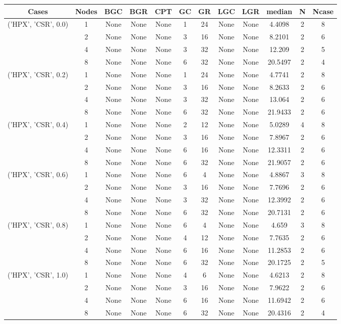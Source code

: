 \begin{tabular}{cccccccccccc}
\hline
Cases & Nodes& BGC& BGR& CPT& GC& GR& LGC& LGR& median & N & Ncase \\
\hline
\multirow{4}{*}{('HPX', 'CSR', 0.0)}& 1& None& None& None& 1& 24& None& None& 4.4098& 2& 8\\
& 2& None& None& None& 3& 16& None& None& 8.2101& 2& 6\\
& 4& None& None& None& 3& 32& None& None& 12.209& 2& 5\\
& 8& None& None& None& 6& 32& None& None& 20.5497& 2& 4\\
\hline
\multirow{4}{*}{('HPX', 'CSR', 0.2)}& 1& None& None& None& 1& 24& None& None& 4.7741& 2& 8\\
& 2& None& None& None& 3& 16& None& None& 8.2633& 2& 6\\
& 4& None& None& None& 3& 32& None& None& 13.064& 2& 6\\
& 8& None& None& None& 6& 32& None& None& 21.9433& 2& 6\\
\hline
\multirow{4}{*}{('HPX', 'CSR', 0.4)}& 1& None& None& None& 2& 12& None& None& 5.0289& 4& 8\\
& 2& None& None& None& 3& 16& None& None& 7.8967& 2& 6\\
& 4& None& None& None& 6& 16& None& None& 12.3311& 2& 6\\
& 8& None& None& None& 6& 32& None& None& 21.9057& 2& 6\\
\hline
\multirow{4}{*}{('HPX', 'CSR', 0.6)}& 1& None& None& None& 6& 4& None& None& 4.8867& 3& 8\\
& 2& None& None& None& 3& 16& None& None& 7.7696& 2& 6\\
& 4& None& None& None& 3& 32& None& None& 12.3992& 2& 6\\
& 8& None& None& None& 6& 32& None& None& 20.7131& 2& 6\\
\hline
\multirow{4}{*}{('HPX', 'CSR', 0.8)}& 1& None& None& None& 6& 4& None& None& 4.659& 3& 8\\
& 2& None& None& None& 4& 12& None& None& 7.7635& 2& 6\\
& 4& None& None& None& 6& 16& None& None& 11.2853& 2& 6\\
& 8& None& None& None& 6& 32& None& None& 20.1725& 2& 5\\
\hline
\multirow{4}{*}{('HPX', 'CSR', 1.0)}& 1& None& None& None& 4& 6& None& None& 4.6213& 2& 8\\
& 2& None& None& None& 3& 16& None& None& 7.9622& 2& 6\\
& 4& None& None& None& 6& 16& None& None& 11.6942& 2& 6\\
& 8& None& None& None& 6& 32& None& None& 20.4316& 2& 4\\
\hline
\end{tabular}
